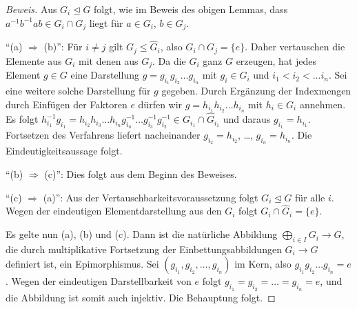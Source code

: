\documentclass[12pt,a4paper,twoside]{article}
\begin{document}
\begin{proof}[Beweis]
Aus $G_i\trianglelefteq G$ folgt, wie im Beweis des obigen Lemmas, dass
  $a^{-1}b^{-1}ab\in G_i\cap G_j$ liegt f\"ur $a\in G_i$, $b\in G_j$.
  
  ``(a) $\Longrightarrow$ (b)'': F\"ur $i\ne j$ gilt $G_j\le \hat G_i$, also
  $G_i\cap G_j=\{e\}$. Daher vertauschen die Elemente aus $G_i$ mit denen aus
  $G_j$. Da die $G_i$ ganz $G$ erzeugen, hat jedes Element $g\in G$ eine
  Darstellung $g=g_{i_1}g_{i_2}\dots g_{i_n}$ mit $g_i\in G_i$ und
  $i_1<i_2<\dots i_n$. Sei eine weitere solche Darstellung f\"ur $g$ gegeben.
  Durch Erg\"anzung der Indexmengen durch Einf\"ugen der Faktoren $e$ d\"urfen
  wir $g=h_{i_1}h_{i_2}\dots h_{i_n}$ mit $h_i\in G_i$ annehmen. Es folgt
  $h_{i_1}^{-1}g_{i_1}=h_{i_2}h_{i_3}\dots h_{i_n}g_{i_n}^{-1}\dots
  g_{i_3}^{-1}g_{i_2}^{-1}\in G_{i_1}\cap \hat G_{i_1}$ und daraus
  $g_{i_1}=h_{i_1}$. Fortsetzen des Verfahrens liefert nacheinander
  $g_{i_2}=h_{i_2}$, \dots, $g_{i_n}=h_{i_n}$. Die Eindeutigkeitsaussage
  folgt.
  
  ``(b) $\Longrightarrow$ (c)'': Dies folgt aus dem Beginn des Beweises.
  
  ``(c) $\Longrightarrow$ (a)'': Aus der Vertauschbarkeitsvoraussetzung
  folgt $G_i\trianglelefteq G$ f\"ur alle $i$. Wegen der eindeutigen
  Elementdarstellung aus den $G_i$ folgt $G_i\cap \hat G_i=\{e\}$.
  
  Es gelte nun (a), (b) und (c). Dann ist die nat\"urliche Abbildung
  $\bigoplus_{i\in I}G_i\to G$, die durch multiplikative Fortsetzung der
  Einbettungsabbildungen $G_i\to G$ definiert ist, ein Epimorphismus. Sei
  $(g_{i_1},g_{i_2},\dots,g_{i_n})$ im Kern, also $g_{i_1}g_{i_2}\dots
  g_{i_n}=e$. Wegen der eindeutigen Darstellbarkeit von $e$ folgt
  $g_{i_1}=g_{i_2}=\dots=g_{i_n}=e$, und die Abbildung ist somit auch
  injektiv. Die Behauptung folgt.
\end{proof}
\end{document}
